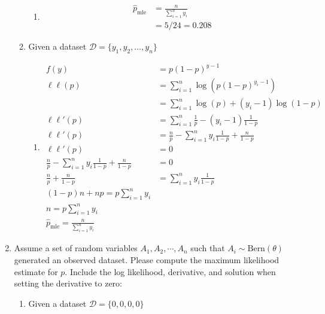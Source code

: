 \documentclass[krantz1,ChapterTOCs]{krantz}
\begin{document}
\begin{enumerate}
\begin{enumerate}
        \begin{enumerate}
            \item { \color{red}
            \begin{align}
             \hat{p}_{\text{mle}}&=\frac{n}{\sum_{i=1}^{n} y_{i}}  \\ 
             &=5/24 = 0.208
            \end{align}
            }
        \end{enumerate}
        \item Given a dataset $\mathcal{D} = \{y_{1}, y_{2}, \dots, y_{n}\}$
        
        \begin{enumerate}
            \item { \color{red} 
            
            \begin{align}
                f(y) &= p(1-p)^{y-1}\\
                \ell \ell(p) &= \sum_{i=1}^{n} \log \left(p(1-p)^{y_{i}-1} \right) \\ 
                &= \sum_{i=1}^{n} \log (p) + (y_{i}-1) \log(1-p) \\
                \ell \ell '(p) &= \sum_{i=1}^{n} \frac{1}{p} - (y_{i}-1) \frac{1}{1-p}  \\
                \ell \ell '(p) &=  \frac{n}{p} - \sum_{i=1}^{n} y_{i} \frac{1}{1-p} + \frac{n}{1-p}  \\
                \ell \ell '(p) &= 0 \\
                \frac{n}{p} - \sum_{i=1}^{n} y_{i} \frac{1}{1-p} + \frac{n}{1-p} & = 0\\
               \frac{n}{p}  + \frac{n}{1-p} & = \sum_{i=1}^{n} y_{i} \frac{1}{1-p}\\
               (1-p)n + np = p \sum_{i=1}^{n} y_{i}\\
               n = p \sum_{i=1}^{n} y_{i}\\
               \hat{p}_{\text{mle}}=\frac{n}{\sum_{i=1}^{n} y_{i}}
            \end{align}
            
            
            }
        \end{enumerate}
    \end{enumerate}
    
    \item Assume a set of random variables $A_{1}, A_{2}, \cdots, A_{n}$ such that $A_{i} \sim \text{Bern}(\theta)$ generated an observed dataset. Please compute the maximum likelihood estimate for $p$. Include the log likelihood, derivative, and solution when setting the derivative to zero: 
    \begin{enumerate}
        \item Given a dataset $\mathcal{D} = \{ 0,0,0,0 \}$
        

\end{enumerate}
\end{enumerate}
\end{document}
